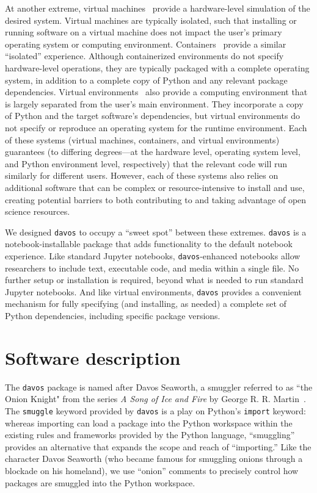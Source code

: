\documentclass[preprint,12pt,a4paper]{elsarticle}
\begin{document}
At another extreme, virtual machines~\cite{Gold74, AltiEtal05, Rose99}
provide a hardware-level simulation of the desired system.  Virtual
machines are typically isolated, such that installing or running
software on a virtual machine does not impact the user's primary
operating system or computing environment.
Containers~\cite[e.g.,][]{Merk14, KurtEtal17} provide a similar
``isolated'' experience. Although containerized environments do not
specify hardware-level operations, they are typically packaged with a
complete operating system, in addition to a complete copy of Python
and any relevant package dependencies. Virtual
environments~\cite[e.g.,][]{Anac12, Eust19} also provide a computing
environment that is largely separated from the user's main
environment. They incorporate a copy of Python and the target
software's dependencies, but virtual environments do not specify or
reproduce an operating system for the runtime environment. Each of
these systems (virtual machines, containers, and virtual environments)
guarantees (to differing degrees---at the hardware level, operating
system level, and Python environment level, respectively) that the
relevant code will run similarly for different users. However, each of
these systems also relies on additional software that can be complex
or resource-intensive to install and use, creating potential barriers
to both contributing to and taking advantage of open science
resources.

We designed \texttt{davos} to occupy a ``sweet spot'' between these
extremes.  \texttt{davos} is a notebook-installable package that adds
functionality to the default notebook experience. Like standard
Jupyter notebooks, \texttt{davos}-enhanced notebooks allow researchers
to include text, executable code, and media within a single file. No
further setup or installation is required, beyond what is needed to
run standard Jupyter notebooks. And like virtual environments,
\texttt{davos} provides a convenient mechanism for fully specifying
(and installing, as needed) a complete set of Python dependencies,
including specific package versions.


\section{Software description}

The \texttt{davos} package is named after Davos Seaworth, a smuggler
referred to as ``the Onion Knight" from the series \textit{A Song of
  Ice and Fire} by George R. R. Martin~\cite{Mart98}.  The
\texttt{smuggle} keyword provided by \texttt{davos}
is a play on Python's \texttt{import} keyword: whereas importing can
load a package into the Python workspace within the existing rules
and frameworks provided by the Python language, ``smuggling'' provides
an alternative that expands the scope and reach of ``importing.''
Like the character Davos Seaworth (who became famous for smuggling
onions through a blockade on his homeland), we use ``onion'' comments
to precisely control how packages are smuggled into the Python
workspace.
\end{document}
